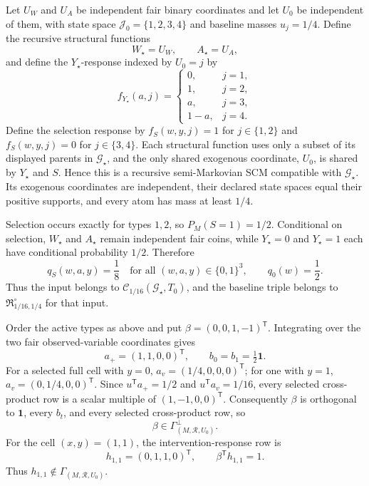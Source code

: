 Let \(U_W\) and \(U_A\) be independent fair binary coordinates and let \(U_0\) be independent of them, with state space \(\mathcal J_0=\{1,2,3,4\}\) and baseline masses \(u_j=1/4\).  Define the recursive structural functions
\[
 W_\star=U_W,
 \qquad A_\star=U_A,
\]
and define the \(Y_\star\)-response indexed by \(U_0=j\) by
\[
 f_{Y_\star}(a,j)=
 \begin{cases}
 0,&j=1,\\
 1,&j=2,\\
 a,&j=3,\\
 1-a,&j=4.
 \end{cases}
\]
Define the selection response by \(f_S(w,y,j)=1\) for \(j\in\{1,2\}\) and \(f_S(w,y,j)=0\) for \(j\in\{3,4\}\).  Each structural function uses only a subset of its displayed parents in \(\mathcal G_\star\), and the only shared exogenous coordinate, \(U_0\), is shared by \(Y_\star\) and \(S\).  Hence this is a recursive semi-Markovian SCM compatible with \(\mathcal G_\star\).  Its exogenous coordinates are independent, their declared state spaces equal their positive supports, and every atom has mass at least \(1/4\).

Selection occurs exactly for types \(1,2\), so \(P_M(S=1)=1/2\).  Conditional on selection, \(W_\star\) and \(A_\star\) remain independent fair coins, while \(Y_\star=0\) and \(Y_\star=1\) each have conditional probability \(1/2\).  Therefore
\[
 q_S(w,a,y)=\frac18\quad\text{for all }(w,a,y)\in\{0,1\}^3,
 \qquad q_0(w)=\frac12.
\]
Thus the input belongs to \(\mathcal C_{1/16}(\mathcal G_\star,T_0)\), and the baseline triple belongs to \(\mathfrak R_{1/16,1/4}^{\circ}\) for that input.

Order the active types as above and put \(\beta=(0,0,1,-1)^{\mathsf T}\).  Integrating over the two fair observed-variable coordinates gives
\[
 a_+=(1,1,0,0)^{\mathsf T},
 \qquad b_0=b_1=\tfrac12\mathbf 1.
\]
For a selected full cell with \(y=0\), \(a_v=(1/4,0,0,0)^{\mathsf T}\); for one with \(y=1\), \(a_v=(0,1/4,0,0)^{\mathsf T}\).  Since \(u^{\mathsf T}a_+=1/2\) and \(u^{\mathsf T}a_v=1/16\), every selected cross-product row is a scalar multiple of \((1,-1,0,0)^{\mathsf T}\).  Consequently \(\beta\) is orthogonal to \(\mathbf 1\), every \(b_t\), and every selected cross-product row, so
\[
 \beta\in\Gamma_{(M,\mathcal R,U_0)}^\perp.
\]
For the cell \((x,y)=(1,1)\), the intervention-response row is
\[
 h_{1,1}=(0,1,1,0)^{\mathsf T},
 \qquad \beta^{\mathsf T}h_{1,1}=1.
\]
Thus \(h_{1,1}\notin\Gamma_{(M,\mathcal R,U_0)}\).

